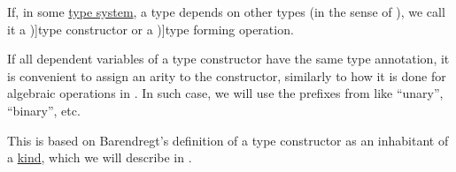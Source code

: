 \begin{concept}\label{con:type_constructor}\mimprovised
  If, in some \hyperref[def:abstract_type_system]{type system}, a type depends on other types (in the sense of ), we call it a \term[en=type constructor (\cite[198]{Barendregt1992LambdaCalculiWithTypes})]{type constructor} or a \term[en=type forming operation (\cite[83]{MartinLöf1975IntuitionisticTypeTheory})]{type forming operation}.

  If all dependent variables of a type constructor have the same type annotation, it is convenient to assign an arity to the constructor, similarly to how it is done for algebraic operations in . In such case, we will use the prefixes from  like \enquote{unary}, \enquote{binary}, etc.
\end{concept}
\begin{comments}
  \item This is based on Barendregt's definition of a type constructor as an inhabitant of a \hyperref[con:type_universe]{kind}, which we will describe in .
\end{comments}

